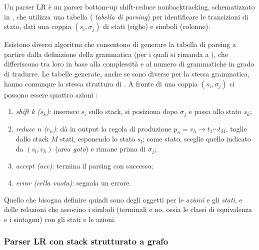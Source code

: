 \documentclass[twoside,stylearticle,11pt,filologia,it,article,bibsection]{spinoza}
\newcommand\spzmbnf{→}
\begin{document}
Un parser LR è un parser bottom-up shift-reduce nonbacktracking,
schematizzato in , che utilizza una tabella ({\it
  tabella di parsing}) per identificare le transizioni di stato, dati
una coppia $(s_i,\sigma_j)$ di stati (righe) e simboli (colonne).

Esistono diversi algoritmi che consentono di generare la tabella di
parsing a partire dalla definizione della grammatica (per i quali si
rimanda a ), che differiscono tra
loro in base alla complessità e al numero di grammatiche in grado di
tradurre. Le tabelle generate, anche se sono diverse per la stessa
grammatica, hanno comunque la stessa struttura di
. A fronte di una coppia $(s_i,\sigma_j)$ ci
possono essere quattro azioni :
\begin{enumerate}
\item {\it shift k ($s_k$)}: inserisce $s_i$ sullo stack, si posiziona
  dopo $\sigma_j$ e passa allo stato $s_k$;
\item {\it reduce n ($r_n$)}: dà in output la regola di produzione
  $p_n=v_h\spzmbnf t_1\cdots t_M$, toglie dallo stack $M$ stati, esponendo lo
  stato $s_l$; come stato, sceglie quello indicato da $(s_l,v_h)$
  (area {\it goto}) e rimane prima di $\sigma_j$;
\item {\it accept (acc)}: termina il parsing con successo;
\item {\it error (cella vuota)}: segnala un errore.
\end{enumerate}

Quello che bisogna definire quindi sono degli oggetti per le {\it
  azioni} e gli {\it stati}, e delle relazioni che associno i simboli
(terminali e no, ossia le classi di equivalenza e i sintagmi) con gli
stati e le azioni.

\newpage

\subsubsection{Parser LR con stack strutturato a grafo}
\end{document}
